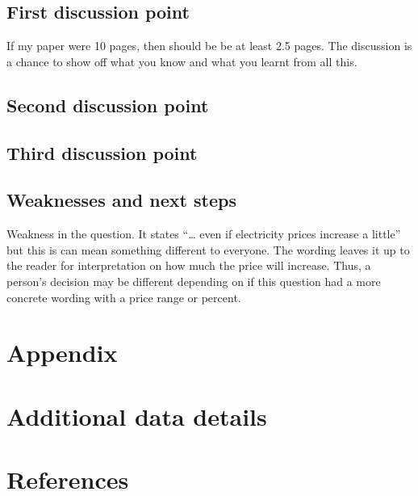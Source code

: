 \documentclass[
  letterpaper,
  DIV=11,
  numbers=noendperiod]{scrartcl}
\begin{document}
\hypertarget{sec-first-point}{%
\subsection{First discussion point}\label{sec-first-point}}

If my paper were 10 pages, then should be be at least 2.5 pages. The
discussion is a chance to show off what you know and what you learnt
from all this.

\hypertarget{second-discussion-point}{%
\subsection{Second discussion point}\label{second-discussion-point}}

\hypertarget{third-discussion-point}{%
\subsection{Third discussion point}\label{third-discussion-point}}

\hypertarget{weaknesses-and-next-steps}{%
\subsection{Weaknesses and next steps}\label{weaknesses-and-next-steps}}

Weakness in the question. It states ``\ldots{} even if electricity
prices increase a little'' but this is can mean something different to
everyone. The wording leaves it up to the reader for interpretation on
how much the price will increase. Thus, a person's decision may be
different depending on if this question had a more concrete wording with
a price range or percent.

\newpage

\appendix

\hypertarget{appendix}{%
\section*{Appendix}\label{appendix}}

\hypertarget{additional-data-details}{%
\section{Additional data details}\label{additional-data-details}}

\newpage

\hypertarget{references}{%
\section{References}\label{references}}
\end{document}

